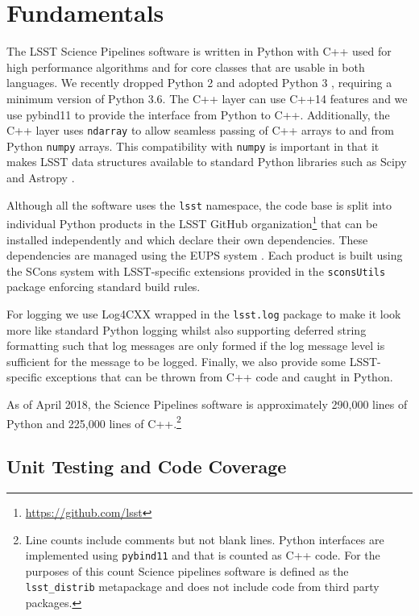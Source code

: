 \section{Fundamentals}

The LSST Science Pipelines software is written in Python with C++ used for high performance algorithms and for core classes that are usable in both languages.
We recently dropped Python 2 and adopted Python 3 \citep{2017arXiv171200461J}, requiring a minimum version of Python 3.6.
The C++ layer can use C++14 features and we use pybind11 to provide the interface from Python to C++.
Additionally, the C++ layer uses \texttt{ndarray} to allow seamless passing of C++ arrays to and from Python \texttt{numpy} arrays.
This compatibility with \texttt{numpy} is important in that it makes LSST data structures available to standard Python libraries such as Scipy and Astropy \citep{2016SPIE.9913E..0GJ,2018arXiv180102634T}.

Although all the software uses the \texttt{lsst} namespace, the code base is split into individual Python products in the LSST GitHub organization\footnote{\url{https://github.com/lsst}} that can be installed independently and which declare their own dependencies.
These dependencies are managed using the EUPS system \citep{EUPS,2018SPIE10707-10J}.
Each product is built using the SCons system \citep{2005Scons1377085} with LSST-specific extensions provided in the \texttt{sconsUtils} package enforcing standard build rules.

For logging we use Log4CXX wrapped in the \texttt{lsst.log} package to make it look more like standard Python logging whilst also supporting deferred string formatting such that log messages are only formed if the log message level is sufficient for the message to be logged.
Finally, we also provide some LSST-specific exceptions that can be thrown from C++ code and caught in Python.

As of April 2018, the Science Pipelines software is approximately 290,000 lines of Python and 225,000 lines of C++.\footnote{Line counts include comments but not blank lines. Python interfaces are implemented using \texttt{pybind11} and that is counted as C++ code. For the purposes of this count Science pipelines software is defined as the \texttt{lsst\_distrib} metapackage and does not include code from third party packages.}

\subsection{Unit Testing and Code Coverage}

